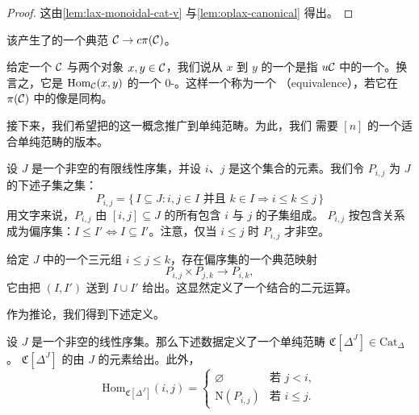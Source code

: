 \begin{proof}
这由\cref{lem:lax-monoidal-cat-v} 与\cref{lem:oplax-canonical} 得出。
\end{proof}

\begin{observation}\label{obs:canonical-functor-c-pi}
该\trAdjunction{}产生了\trSimplicialCategory{}的一个典范\trFunctor{} $\mathcal{C} \to c\pi(\mathcal{C})$。
\end{observation}

\begin{definition}\label{def:morphism-simplicial-category}
给定一个\trSimplicialCategory{} $\mathcal{C}$ 与两个对象 $x, y \in \mathcal{C}$，我们说从 $x$ 到 $y$
的一个\trMorphism{}是指\trUnderlyingCategory{} $u\mathcal{C}$ 中的一个\trMorphism{}。换言之，它是
$\mathrm{Hom}_{\mathcal{C}}(x, y)$ 的一个 $0$-\trSimplex{}。这样一个\trMorphism{}称为一个%
\emph{\trEquivalence{}}（equivalence），若它在 $\pi(\mathcal{C})$ 中的像是同构。
\end{definition}

接下来，我们希望把\trCategory{}的\trNerve{}这一概念推广到单纯\trEnrichment{}范畴。为此，我们
需要\trCategory{} $[n]$ 的一个适合单纯\trEnrichment{}范畴的版本。

\begin{definition}\label{def:p-i-j}
设 $J$ 是一个非空的有限线性序集，并设 $i$、$j$ 是这个集合的元素。我们令 $P_{i,j}$ 为
$J$ 的下述子集之集：
\[
P_{i,j} = \{\, I \subseteq J : i, j \in I \text{ 并且 } k \in I \Rightarrow
i \le k \le j \,\}
\]
用文字来说，$P_{i,j}$ 由 $[i, j] \subseteq J$ 的所有包含 $i$ 与 $j$ 的子集组成。
$P_{i,j}$ 按包含关系成为偏序集：$I \le I' \iff I \subseteq I'$。注意，仅当
$i \le j$ 时 $P_{i,j}$ 才非空。
\end{definition}

\begin{observation}\label{obs:p-i-j-union}
给定 $J$ 中的一个三元组 $i \le j \le k$，存在偏序集的一个典范映射
\[
P_{i,j} \times P_{j,k} \to P_{i,k},
\]
它由把 $(I, I')$ 送到 $I \cup I'$ 给出。这显然定义了一个结合的二元运算。
\end{observation}

作为推论，我们得到下述定义。

\begin{definition}\label{def:c-delta-j}
设 $J$ 是一个非空的线性序集。那么下述数据定义了一个单纯\trEnrichment{}范畴
$\mathfrak{C}[\Delta^J] \in \mathrm{Cat}_{\Delta}$。
$\mathfrak{C}[\Delta^J]$ 的\trObject{}由 $J$ 的元素给出。此外，
\[
\mathrm{Hom}_{\mathfrak{C}[\Delta^J]}(i, j) =
\begin{cases}
\varnothing & \text{若 } j < i,\\
\mathrm{N}(P_{i,j}) & \text{若 } i \le j.
\end{cases}
\]
\end{definition}

